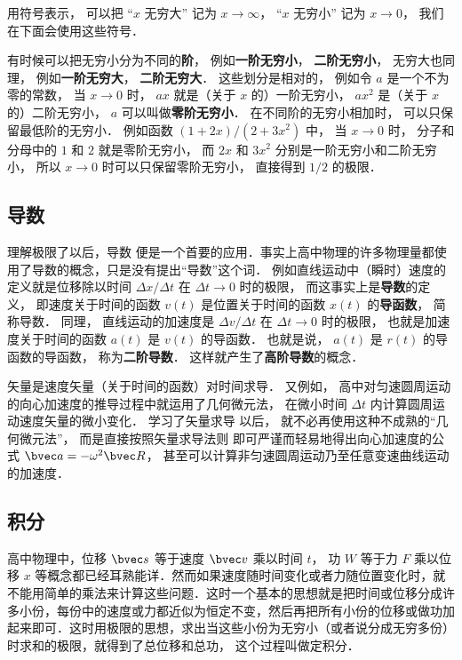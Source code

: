 用符号表示， 可以把 “$x$ 无穷大” 记为 $x \to \infty$， “$x$ 无穷小” 记为 $x \to 0$， 我们在下面会使用这些符号．

有时候可以把无穷小分为不同的\textbf{阶}， 例如\textbf{一阶无穷小}， \textbf{二阶无穷小}， 无穷大也同理， 例如\textbf{一阶无穷大}， \textbf{二阶无穷大}． 这些划分是相对的， 例如令 $a$ 是一个不为零的常数， 当 $x \to 0$ 时， $a x$ 就是（关于 $x$ 的）一阶无穷小， $a x^2$ 是（关于 $x$ 的）二阶无穷小， $a$ 可以叫做\textbf{零阶无穷小}． 在不同阶的无穷小相加时， 可以只保留最低阶的无穷小． 例如函数 $(1+2x)/(2+3x^2)$ 中， 当 $x\to 0$ 时， 分子和分母中的 $1$ 和 $2$ 就是零阶无穷小， 而 $2x$ 和 $3x^2$ 分别是一阶无穷小和二阶无穷小， 所以 $x\to 0$ 时可以只保留零阶无穷小， 直接得到 $1/2$ 的极限．

\subsection{导数}
理解极限了以后，导数 便是一个首要的应用．事实上高中物理的许多物理量都使用了导数的概念，只是没有提出“导数”这个词． 例如直线运动中（瞬时）速度的定义就是位移除以时间 $\Delta x/\Delta t$ 在 $\Delta t \to 0$ 时的极限， 而这事实上是\textbf{导数}的定义， 即速度关于时间的函数 $v(t)$ 是位置关于时间的函数 $x(t)$ 的\textbf{导函数}， 简称导数． 同理， 直线运动的加速度是 $\Delta v/\Delta t$ 在 $\Delta t \to 0$ 时的极限， 也就是加速度关于时间的函数 $a(t)$ 是 $v(t)$ 的导函数． 也就是说， $a(t)$ 是 $r(t)$ 的导函数的导函数， 称为\textbf{二阶导数}． 这样就产生了\textbf{高阶导数}的概念．

矢量是速度矢量（关于时间的函数）对时间求导． 又例如， 高中对匀速圆周运动的向心加速度的推导过程中就运用了几何微元法， 在微小时间 $\Delta t$ 内计算圆周运动速度矢量的微小变化． 学习了矢量求导 以后， 就不必再使用这种不成熟的“几何微元法”， 而是直接按照矢量求导法则 即可严谨而轻易地得出向心加速度的公式 $\bvec a = -\omega^2 \bvec R$， 甚至可以计算非匀速圆周运动乃至任意变速曲线运动的加速度．

\subsection{积分}
高中物理中，位移 $\bvec s$ 等于速度 $\bvec v$ 乘以时间 $t$， 功 $W$ 等于力 $F$ 乘以位移 $x$ 等概念都已经耳熟能详．然而如果速度随时间变化或者力随位置变化时，就不能用简单的乘法来计算这些问题．这时一个基本的思想就是把时间或位移分成许多小份，每份中的速度或力都近似为恒定不变，然后再把所有小份的位移或做功加起来即可．这时用极限的思想，求出当这些小份为无穷小（或者说分成无穷多份）时求和的极限，就得到了总位移和总功， 这个过程叫做定积分． %

